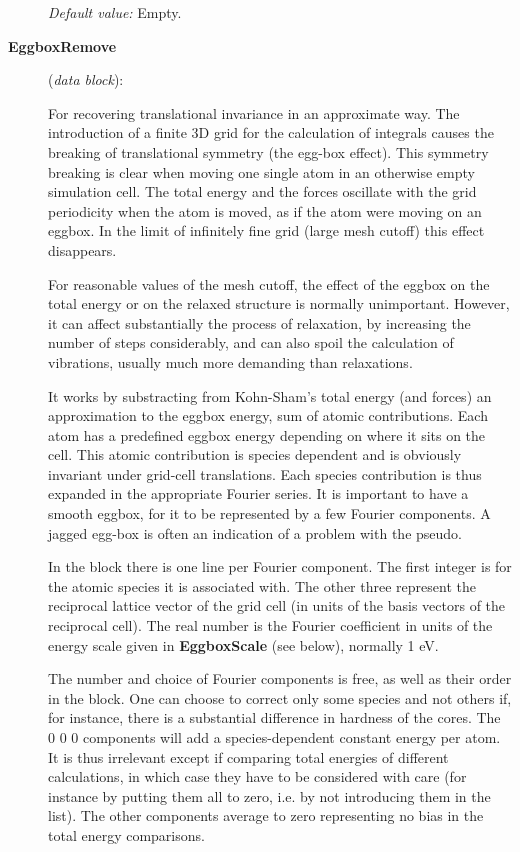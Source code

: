\documentclass[11pt]{article}
\begin{document}
\begin{description}
{\it Default value:} Empty.


\item[{\bf EggboxRemove}] ({\it data block}):

For recovering translational invariance in an approximate way.
The introduction of a finite 3D grid for the calculation of integrals
causes the breaking of translational symmetry (the egg-box effect). 
This symmetry breaking is clear when
moving one single atom in an otherwise empty simulation cell. The total
energy and the forces oscillate with the grid periodicity when the
atom is moved, as if the atom were moving on an eggbox. In the limit of
infinitely fine grid (large mesh cutoff) this effect disappears.

For reasonable values of the mesh cutoff, the effect of the eggbox 
on the total energy or on the relaxed structure is normally unimportant.
However, it can affect substantially the process of relaxation, by 
increasing the number of steps considerably, and can also spoil the
calculation of vibrations, usually much more demanding than relaxations.

It works by substracting from Kohn-Sham's total energy (and forces) an
approximation to the eggbox energy, sum of atomic contributions. 
Each atom has a predefined eggbox energy depending on where it sits on
the cell. This atomic contribution is species dependent and is 
obviously invariant under grid-cell translations. Each species
contribution is thus expanded in the appropriate Fourier series.
It is important to have a smooth eggbox, for it to  
be represented by a few Fourier components. A jagged egg-box is often an
indication of a problem with the pseudo.

In the block there is one line per Fourier component. The first integer
is for the atomic species it is associated with. The other three
represent the reciprocal lattice vector of the grid cell (in units
of the basis vectors of the reciprocal cell). The real number is
the Fourier coefficient in units of the energy scale given in 
{\bf EggboxScale} (see below), normally 1 eV.

The number and choice of Fourier components is free, as well as their
order in the block. One can choose to correct only some species and not
others if, for instance, there is a substantial difference in hardness
of the cores. The 0 0 0 components will add a species-dependent
constant energy per atom. It is thus irrelevant except if comparing
total energies of different calculations, in which case they 
have to be considered with care (for instance by putting them all to zero,
i.e. by not introducing them in the list). 
The other components average to zero representing no bias in the
total energy comparisons. 


\end{description}
\end{document}
